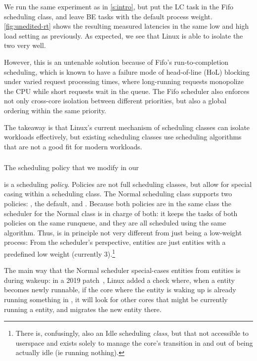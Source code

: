 We run the same experiment as in \autoref{s:intro}, but put the LC task in the
Fifo scheduling class, and leave BE tasks with the default process weight.
\autoref{fig:unedited-rt} shows the resulting measured latencies in the same low
and high load setting as previously. As expected, we see that Linux is able to
isolate the two very well. 

However, this is an untenable solution because of Fifo's run-to-completion
scheduling, which is known to have a failure mode of head-of-line (HoL) blocking
under varied request processing times, where long-running requests monopolize
the CPU while short requests wait in the queue. The Fifo scheduler also enforces
not only cross-core isolation between different priorities, but also a global
ordering within the same priority.

The takeaway is that Linux's current mechanism of scheduling classes can isolate
workloads effectively, but existing scheduling classes use scheduling
algorithms that are not a good fit for modern workloads.

\subsubsection{\schedidle}

The scheduling policy \schedidle{} that we modify in our 

\schedidle{} is a scheduling \textit{policy}. Policies are not full scheduling
classes, but allow for special casing within a scheduling class. The Normal
scheduling class supports two policies: \schednormal{}, the default, and
\schedidle{}. Because both policies are in the same class the scheduler for the
Normal class is in charge of both: it keeps the tasks of both policies on the
same runqueue, and they are all scheduled using the same algorithm. Thus,
\schedidle{} is in principle not very different from just being a low-weight
process: From the scheduler's perspective, \schedidle{} entities are just
entities with a predefined low weight (currently 3).\footnote{There is,
confusingly, also an Idle scheduling \textit{class}, but that not accessible to
userspace and exists solely to manage the core's transition in and out of being
actually idle (ie running nothing).}

The main way that the Normal scheduler special-cases \schedidle{} entities from
\schednormal{} entities is during wakeup: in a 2019 patch~\cite{TODO}, Linux
added a check where, when a \schednormal{} entity becomes newly runnable, if the
core where the entity is waking up is already running something in
\schednormal{}, it will look for other cores that might be currently running a
\schedidle{} entity, and migrates the new entity there.

